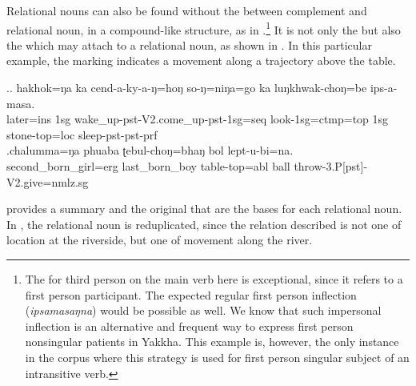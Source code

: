 	
Relational nouns can also be found without the  between complement and relational noun, in a compound-like structure, as in  \Next[a].\footnote{The  for third person on the main verb here is exceptional, since it refers to a first person participant. The expected regular first person inflection (\emph{ipsamasaŋna}) would be possible as well. We know that such impersonal inflection is an alternative and frequent way to express first person nonsingular patients in Yakkha. This example is, however, the only instance in the corpus where this strategy is used for first person singular subject of an intransitive verb.} 	It is not only the  but also the  which may attach to a relational noun, as shown in \Next[b]. In this particular example, the  marking indicates a movement along a trajectory above the table.
		
 \ex.\ag. hakhok=ŋa  ka  cend-a-ky-a-ŋ=hoŋ so-ŋ=niŋa=go ka  luŋkhwak-choŋ=be  ips-a-masa.\\
	later{\sc =ins} {\sc 1sg} wake\_up{\sc -pst-V2.come\_up-pst-1sg=seq} look{\sc -1sg=ctmp=top} {\sc 1sg} stone-top{\sc =loc} sleep{\sc [3sg]-pst-pst-prf}\\
	 
	\bg.chalumma=ŋa phuaba ʈebul-choŋ=bhaŋ bol lept-u-bi=na.\\
	second\_born\_girl{\sc =erg} last\_born\_boy table-top{\sc =abl} ball throw{\sc -3.P[pst]-V2.give=nmlz.sg}\\
	
 provides a summary and the original  that are the bases for each relational noun. In \Next, the relational noun is reduplicated, since the relation described is not one of location at the riverside, but one of movement along the river.

